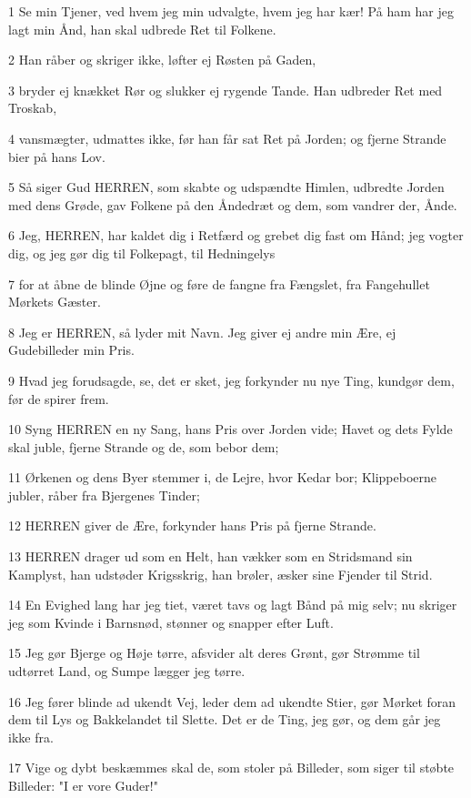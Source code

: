 \par 1 Se min Tjener, ved hvem jeg min udvalgte, hvem jeg har kær! På ham har jeg lagt min Ånd, han skal udbrede Ret til Folkene.
\par 2 Han råber og skriger ikke, løfter ej Røsten på Gaden,
\par 3 bryder ej knækket Rør og slukker ej rygende Tande. Han udbreder Ret med Troskab,
\par 4 vansmægter, udmattes ikke, før han får sat Ret på Jorden; og fjerne Strande bier på hans Lov.
\par 5 Så siger Gud HERREN, som skabte og udspændte Himlen, udbredte Jorden med dens Grøde, gav Folkene på den Åndedræt og dem, som vandrer der, Ånde.
\par 6 Jeg, HERREN, har kaldet dig i Retfærd og grebet dig fast om Hånd; jeg vogter dig, og jeg gør dig til Folkepagt, til Hedningelys
\par 7 for at åbne de blinde Øjne og føre de fangne fra Fængslet, fra Fangehullet Mørkets Gæster.
\par 8 Jeg er HERREN, så lyder mit Navn. Jeg giver ej andre min Ære, ej Gudebilleder min Pris.
\par 9 Hvad jeg forudsagde, se, det er sket, jeg forkynder nu nye Ting, kundgør dem, før de spirer frem.
\par 10 Syng HERREN en ny Sang, hans Pris over Jorden vide; Havet og dets Fylde skal juble, fjerne Strande og de, som bebor dem;
\par 11 Ørkenen og dens Byer stemmer i, de Lejre, hvor Kedar bor; Klippeboerne jubler, råber fra Bjergenes Tinder;
\par 12 HERREN giver de Ære, forkynder hans Pris på fjerne Strande.
\par 13 HERREN drager ud som en Helt, han vækker som en Stridsmand sin Kamplyst, han udstøder Krigsskrig, han brøler, æsker sine Fjender til Strid.
\par 14 En Evighed lang har jeg tiet, været tavs og lagt Bånd på mig selv; nu skriger jeg som Kvinde i Barnsnød, stønner og snapper efter Luft.
\par 15 Jeg gør Bjerge og Høje tørre, afsvider alt deres Grønt, gør Strømme til udtørret Land, og Sumpe lægger jeg tørre.
\par 16 Jeg fører blinde ad ukendt Vej, leder dem ad ukendte Stier, gør Mørket foran dem til Lys og Bakkelandet til Slette. Det er de Ting, jeg gør, og dem går jeg ikke fra.
\par 17 Vige og dybt beskæmmes skal de, som stoler på Billeder, som siger til støbte Billeder: "I er vore Guder!"
